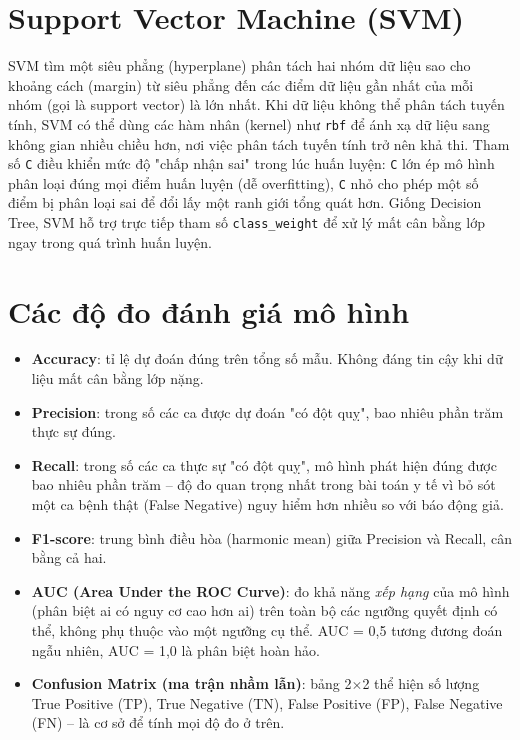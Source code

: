 \documentclass[12pt,a4paper]{report}
\begin{document}
\section{Support Vector Machine (SVM)}

SVM tìm một siêu phẳng (hyperplane) phân tách hai nhóm dữ liệu sao cho khoảng cách (margin) từ siêu phẳng đến các điểm dữ liệu gần nhất của mỗi nhóm (gọi là support vector) là lớn nhất. Khi dữ liệu không thể phân tách tuyến tính, SVM có thể dùng các hàm nhân (kernel) như \texttt{rbf} để ánh xạ dữ liệu sang không gian nhiều chiều hơn, nơi việc phân tách tuyến tính trở nên khả thi. Tham số \texttt{C} điều khiển mức độ "chấp nhận sai" trong lúc huấn luyện: \texttt{C} lớn ép mô hình phân loại đúng mọi điểm huấn luyện (dễ overfitting), \texttt{C} nhỏ cho phép một số điểm bị phân loại sai để đổi lấy một ranh giới tổng quát hơn. Giống Decision Tree, SVM hỗ trợ trực tiếp tham số \texttt{class\_weight} để xử lý mất cân bằng lớp ngay trong quá trình huấn luyện.

\section{Các độ đo đánh giá mô hình}

\begin{itemize}
    \item \textbf{Accuracy}: tỉ lệ dự đoán đúng trên tổng số mẫu. Không đáng tin cậy khi dữ liệu mất cân bằng lớp nặng.
    \item \textbf{Precision}: trong số các ca được dự đoán "có đột quỵ", bao nhiêu phần trăm thực sự đúng.
    \item \textbf{Recall}: trong số các ca thực sự "có đột quỵ", mô hình phát hiện đúng được bao nhiêu phần trăm -- độ đo quan trọng nhất trong bài toán y tế vì bỏ sót một ca bệnh thật (False Negative) nguy hiểm hơn nhiều so với báo động giả.
    \item \textbf{F1-score}: trung bình điều hòa (harmonic mean) giữa Precision và Recall, cân bằng cả hai.
    \item \textbf{AUC (Area Under the ROC Curve)}: đo khả năng \emph{xếp hạng} của mô hình (phân biệt ai có nguy cơ cao hơn ai) trên toàn bộ các ngưỡng quyết định có thể, không phụ thuộc vào một ngưỡng cụ thể. AUC = 0,5 tương đương đoán ngẫu nhiên, AUC = 1,0 là phân biệt hoàn hảo.
    \item \textbf{Confusion Matrix (ma trận nhầm lẫn)}: bảng 2$\times$2 thể hiện số lượng True Positive (TP), True Negative (TN), False Positive (FP), False Negative (FN) -- là cơ sở để tính mọi độ đo ở trên.
\end{itemize}
\end{document}

